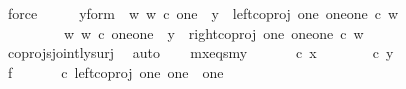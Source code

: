\begin{isabellebody}
\ force\isanewline
\ \ \isamarkupfalse%
\ \isamarkupfalse%
\ y{\isacharunderscore}{\kern0pt}form{\isacharcolon}{\kern0pt}\ {\isachardoublequoteopen}{\isacharparenleft}{\kern0pt}{\isasymexists}\ w{\isachardot}{\kern0pt}\ w\ {\isasymin}\isactrlsub c\ one\ {\isasymand}\ y\ {\isacharequal}{\kern0pt}\ left{\isacharunderscore}{\kern0pt}coproj\ one\ {\isacharparenleft}{\kern0pt}one{\isasymCoprod}one{\isacharparenright}{\kern0pt}\ {\isasymcirc}\isactrlsub c\ w{\isacharparenright}{\kern0pt}\isanewline
\ \ \ \ \ \ {\isasymor}\ \ {\isacharparenleft}{\kern0pt}{\isasymexists}\ w{\isachardot}{\kern0pt}\ w\ {\isasymin}\isactrlsub c\ one{\isasymCoprod}one\ {\isasymand}\ y\ {\isacharequal}{\kern0pt}\ right{\isacharunderscore}{\kern0pt}coproj\ one\ {\isacharparenleft}{\kern0pt}one{\isasymCoprod}one{\isacharparenright}{\kern0pt}\ {\isasymcirc}\isactrlsub c\ w{\isacharparenright}{\kern0pt}{\isachardoublequoteclose}\isanewline
\ \ \ \ \isamarkupfalse%
\ coprojs{\isacharunderscore}{\kern0pt}jointly{\isacharunderscore}{\kern0pt}surj\ \isamarkupfalse%
\ auto\isanewline
\isanewline
\ \ \isamarkupfalse%
\ mx{\isacharunderscore}{\kern0pt}eqs{\isacharunderscore}{\kern0pt}my{\isacharcolon}{\kern0pt}\ {\isachardoublequoteopen}{\isasymlangle}{\isasymf}{\isacharcomma}{\kern0pt}\ {\isasymf}{\isasymrangle}\ {\isasymamalg}\ {\isasymlangle}{\isasymt}{\isacharcomma}{\kern0pt}{\isasymf}{\isasymrangle}\ {\isasymamalg}\ {\isasymlangle}{\isasymf}{\isacharcomma}{\kern0pt}{\isasymt}{\isasymrangle}\ {\isasymcirc}\isactrlsub c\ x\ {\isacharequal}{\kern0pt}\ {\isasymlangle}{\isasymf}{\isacharcomma}{\kern0pt}\ {\isasymf}{\isasymrangle}\ {\isasymamalg}\ {\isasymlangle}{\isasymt}{\isacharcomma}{\kern0pt}{\isasymf}{\isasymrangle}\ {\isasymamalg}\ {\isasymlangle}{\isasymf}{\isacharcomma}{\kern0pt}{\isasymt}{\isasymrangle}\ {\isasymcirc}\isactrlsub c\ y{\isachardoublequoteclose}\isanewline
\isanewline
\ \ \isamarkupfalse%
\ f{}{\isacharcolon}{\kern0pt}\ {\isachardoublequoteopen}{\isasymlangle}{\isasymf}{\isacharcomma}{\kern0pt}\ {\isasymf}{\isasymrangle}\ {\isasymamalg}\ {\isasymlangle}{\isasymt}{\isacharcomma}{\kern0pt}{\isasymf}{\isasymrangle}\ {\isasymamalg}\ {\isasymlangle}{\isasymf}{\isacharcomma}{\kern0pt}{\isasymt}{\isasymrangle}\ {\isasymcirc}\isactrlsub c\ left{\isacharunderscore}{\kern0pt}coproj\ one\ {\isacharparenleft}{\kern0pt}one\ {\isasymCoprod}\ one{\isacharparenright}{\kern0pt}\ {\isacharequal}{\kern0pt}\ {\isasymlangle}{\isasymf}{\isacharcomma}{\kern0pt}\ {\isasymf}{\isasymrangle}{\isachardoublequoteclose}\isanewline

\end{isabellebody}
